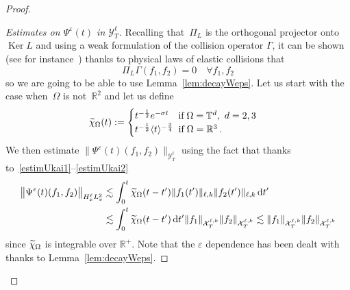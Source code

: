 \documentclass[11pt]{article}
\theoremstyle{definition}
\numberwithin{equation}{section}
\numberwithin{figure}{section}
\numberwithin{table}{section}
\newcommand*{\dd}{\mathrm{d}}
\newcommand*{\dt}{\dd t}
\newenvironment{laststep}[1]{\begin{proof}[#1]}{\end{proof}}
\newcommand*\R {\mathbb{R}}
\newcommand*\T {\mathbb{T}}
\newcommand*\eps{{\varepsilon}}
\newcommand*\e{{\varepsilon}}
\let\oldforall\forall
\renewcommand*{\forall}{\mathrel{\oldforall}}
\let\oldtilde\tilde
\renewcommand*{\tilde}[1]{\mathchoice{\widetilde{#1}}{\widetilde{#1}}{\oldtilde{#1}}{\oldtilde{#1}}}
\begin{document}
\begin{proof}
\begin{laststep}{Estimates on $\Psi^\e(t)$ in $\mathcal{Y}^\ell_T$}
Recalling that~$
\Pi_{L} $ is the orthogonal projector onto $\operatorname{Ker} L$ and using a weak formulation of the collision operator $\Gamma$, it can be shown (see for instance~\cite{Ukai-Yang}) thanks to physical laws of elastic collisions that
\[
\Pi_{L} \Gamma(f_1,f_2) = 0 \quad \forall f_1,f_2
\]
so we are going to be able to use Lemma~\ref{lem:decayWeps}. Let us start with the case when~$\Omega$ is not~$\R^2$ and let us define
\begin{equation}\label{def:tildechi}
\tilde \chi_\Omega(t):=
\begin{cases}
t^{-\frac12} e^{-\sigma t}\quad\text{if}\; \Omega = \T^d, \, \, d = 2,3 \\
t^{-\frac12} \langle t \rangle^{-\frac 34} \;\;\text{if}\; \Omega = \R^3 \,.
\end{cases}
\end{equation}
We then estimate $\|\Psi^{\e}(t) (f_1,f_2)\|_{\mathcal{Y}^\ell_T}$ using the fact that thanks to~\eqref{estimUkai1}--\eqref{estimUkai2}
\begin{align*}
\big \| \Psi^{\e}(t) (f_1,f_2)\big\|_{H^\ell_x L^2_v} &\lesssim \int_0^t \tilde \chi_\Omega(t-t') \|f_1(t')\|_{\ell,k} \|f_2(t')\|_{\ell,k} \, \dt'\\
& \lesssim \int_0^t\tilde \chi_\Omega(t-t') \, \dt' \| f _1 \|_{\mathcal{X}^{\ell,k}_T}\| f _2 \|_{\mathcal{X}^{\ell,k}_T}
\lesssim \| f _1 \|_{\mathcal{X}^{\ell,k}_T}\| f _2 \|_{\mathcal{X}^{\ell,k}_T}
\end{align*}
since $\tilde \chi_\Omega$ is integrable over $\R^+$. Note that the $\eps$ dependence has been dealt with thanks to Lemma~\ref{lem:decayWeps}.


\end{laststep}
\end{proof}
\end{document}
